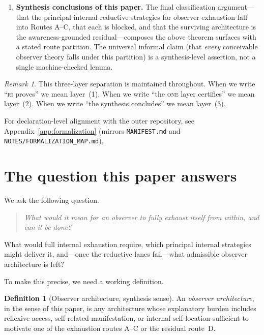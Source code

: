 \documentclass[11pt]{article}
\theoremstyle{plain}
\theoremstyle{definition}
\newtheorem{definition}[theorem]{Definition}
\theoremstyle{remark}
\newtheorem{remark}[theorem]{Remark}
\newcommand{\ONE}{\textsc{one}}
\newcommand{\RI}{\textsc{ri}}
\begin{document}
\begin{sloppypar}
\begin{enumerate}[label=(\arabic*),leftmargin=2.2em]
\item \textbf{Synthesis conclusions of this paper.}
      The final classification argument---that the principal internal
      reductive strategies for observer exhaustion fall into Routes A--C,
      that each is blocked, and that the surviving architecture is the
      awareness-grounded residual---composes the above theorem surfaces
      with a stated route partition.  The universal informal claim (that
      \emph{every} conceivable observer theory falls under this partition)
      is a synthesis-level assertion, not a single machine-checked lemma.
\end{enumerate}
\end{sloppypar}

\begin{remark}
This three-layer separation is maintained throughout.  When we write
``\RI{} proves'' we mean layer~(1).  When we write ``the \ONE{} layer
certifies'' we mean layer~(2).  When we write ``the synthesis concludes''
we mean layer~(3).

\medskip
\noindent
For declaration-level alignment with the outer repository, see
Appendix~\ref{app:formalization} (mirrors \texttt{MANIFEST.md} and
\texttt{NOTES/FORMALIZATION\_MAP.md}).
\end{remark}

\section{The question this paper answers}
\label{sec:question}

We ask the following question.

\begin{quote}
\emph{What would it mean for an observer to fully exhaust itself from
within, and can it be done?}
\end{quote}

\begin{keybox}[title={The guiding question}]
What would full internal exhaustion require, which principal internal
strategies might deliver it, and---once the reductive lanes fail---what
admissible observer architecture is left?
\end{keybox}

To make this precise, we need a working definition.

\begin{definition}[Observer architecture, synthesis sense]
\label{def:obs}
An \emph{observer architecture}, in the sense of this paper, is any
architecture whose explanatory burden includes reflexive access,
self-related manifestation, or internal self-location sufficient to
motivate one of the exhaustion routes A--C or the residual route~D.
\end{definition}
\end{document}
